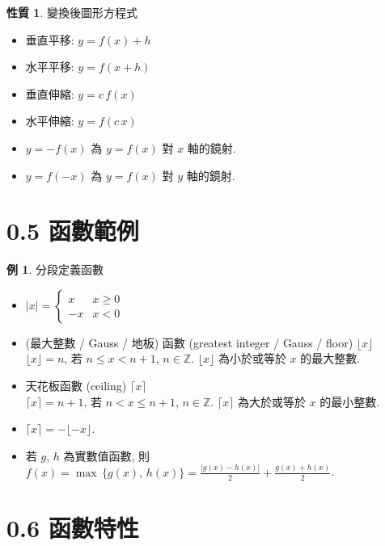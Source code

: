 \documentclass[12pt]{extarticle}
\newcommand{\ds}{\displaystyle}
\newcommand{\floor}[1]{\lfloor #1 \rfloor}
\newcommand{\ceil}[1]{\lceil #1 \rceil}
\theoremstyle{definition}
\newtheorem*{prp}{性質}
\newtheorem*{ex}{例}
\newcommand{\myline}{\noindent\makebox[\linewidth]{\rule{\paperwidth}{0.4pt}}}
\begin{document}
\begin{prp}變換後圖形方程式
  \setlength{\columnsep}{-0mm}
  \begin{multicols}{2}
  \begin{itemize}\setlength\itemsep{0em}
    \item 垂直平移:  $y = f(x) + h$
    \item 水平平移:  $y = f(x + h)$
    \item 垂直伸縮:  $y = c\,f(x)$
    \item 水平伸縮:  $y = f(c\,x)$
    \item $y = -f(x)$ 為 $y = f(x)$ 對 $x$ 軸的鏡射. 
    \item $y = f(-x)$ 為 $y = f(x)$ 對 $y$ 軸的鏡射. 
  \end{itemize}
\end{multicols}
\end{prp}

\section*{0.5 函數範例}

\begin{ex}分段定義函數
  \begin{itemize}\setlength\itemsep{0em}
    \item $\ds|x| = \begin{cases} x & x\geqslant 0 \\ -x & x< 0\end{cases}$
    \item  (最大整數 / Gauss / 地板) 函數 (greatest integer / Gauss / floor) $\floor{x}$ \\
      $\ds\floor{x} = n$, 若 $n\leqslant x < n + 1$, $n\in\mathbb{Z}$. $\floor{x}$ 為小於或等於 $x$ 的最大整數.     
    \item 天花板函數 (ceiling) $\ceil{x}$ \\
      $\ds\ceil{x} = n + 1$, 若 $n < x \leqslant n + 1$, $n\in\mathbb{Z}$. $\ceil{x}$ 為大於或等於 $x$ 的最小整數. 
    \item $\ds\ceil{x} = -\floor{-x}$. 
    \item 若 $g$, $h$ 為實數值函數, 則 $\ds f(x) = \max\,\{g(x),\,h(x)\} = \frac{|g(x) - h(x)|}{2} + \frac{g(x) + h(x)}{2}$. 
  \end{itemize}
\end{ex}

\myline

\section*{0.6 函數特性}
\end{document}
